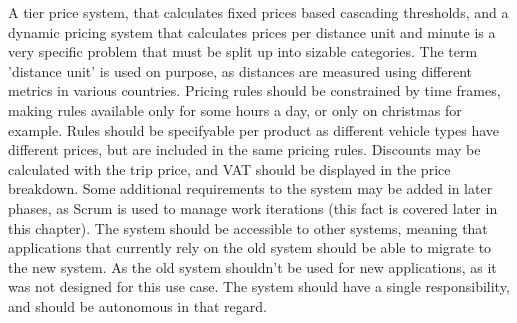 A tier price system, that calculates fixed prices based cascading thresholds, and a dynamic pricing system that calculates prices per distance unit and minute is a very specific problem that must be split up into sizable categories. The term 'distance unit' is used on purpose, as distances are measured using different metrics in various countries. Pricing rules should be constrained by time frames, making rules available only for some hours a day, or only on christmas for example. Rules should be specifyable per product as different vehicle types have different prices, but are included in the same pricing rules. Discounts may be calculated with the trip price, and VAT should be displayed in the price breakdown. Some additional requirements to the system may be added in later phases, as Scrum is used to manage work iterations (this fact is covered later in this chapter). The system should be accessible to other systems, meaning that applications that currently rely on the old system should be able to migrate to the new system. As the old system shouldn't be used for new applications, as it was not designed for this use case. The system should have a single responsibility, and should be autonomous in that regard.